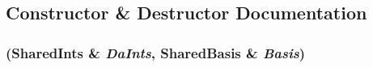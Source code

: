 \subsection{Constructor \& Destructor Documentation}
\hypertarget{classJKBuilder_1_1PsiIntManager_a889963032b8696d99b4b6f17b2b0ea79}{
\subsubsection[{PsiIntManager}]{ ({\bf SharedInts} \& {\em DaInts}, \/  {\bf SharedBasis} \& {\em Basis})}}
\label{classJKBuilder_1_1PsiIntManager_a889963032b8696d99b4b6f17b2b0ea79}


